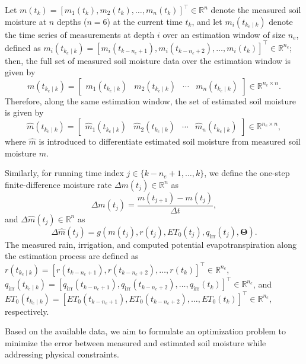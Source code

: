\documentclass[pdflatex,sn-nature]{sn-jnl}%
\theoremstyle{thmstyleone}%
\theoremstyle{thmstyletwo}%
\theoremstyle{thmstylethree}%
\begin{document}
Let \( m(t_k) = [m_1(t_k), m_2(t_k), \dots, m_n(t_k)]^\top \in \mathbb{R}^{n} \) denote the measured soil moisture at $n$ depths ($n=6$) at the current time \( t_k \), and let \( m_i(t_{k_e \mid k}) \) denote the time series of measurements at depth \( i \) over an estimation window of size $n_e$, defined as  
${m_i(t_{k_e \mid k})}=\left[m_i(t_{k-n_e +1}), m_i(t_{k-n_e +2}), \dots, m_i(t_{k}) \right]^\top \in \mathbb{R}^{n_e}$;
then, the full set of measured soil moisture data over the estimation window is given by 
\[
m(t_{k_e \mid k}) = \begin{bmatrix}
m_1(t_{k_e \mid k}) & m_2(t_{k_e \mid k}) & \cdots & m_n(t_{k_e \mid k})
\end{bmatrix} \in \mathbb{R}^{n_e \times n}. 
\] 
Therefore, along the same estimation window, the set of estimated soil moisture is given by  
\[
\hat{m}(t_{k_e \mid k}) = \begin{bmatrix}
\hat{m}_1(t_{k_e \mid k}) & \hat{m}_2(t_{k_e \mid k}) & \cdots & \hat{m}_n(t_{k_e \mid k})
\end{bmatrix} \in \mathbb{R}^{n_e \times n}, 
\] 
where $\hat{m}$ is introduced to differentiate estimated soil moisture from measured soil moisture $m$. 

Similarly, for running time index \( j \in \{k - n_e + 1, \dots, k\} \), we define the one-step finite-difference moisture rate \(\Delta m(t_j) \in \mathbb{R}^{n}\) as 
\[
\Delta m(t_j) = \frac{m(t_{j+1})-m(t_j)}{\Delta t},
\]
and \(\Delta \hat{m}(t_j) \in \mathbb{R}^{n}\) as 
\[
\Delta \hat{m}(t_j) = g(m(t_j),r(t_j),ET_0(t_j),q_{\mathrm{irr}}(t_j),\boldsymbol{\Theta}).
\]
The measured rain, irrigation, and computed potential evapotranspiration along the estimation process are defined as 
${r(t_{k_e \mid k})}=\left[r(t_{k-n_e +1}), r(t_{k-n_e +2}), \dots, r(t_{k}) \right]^\top \in \mathbb{R}^{n_e}$, 
${q_{\mathrm{irr}}(t_{k_e \mid k})}=\left[q_{\mathrm{irr}}(t_{k-n_e +1}), q_{\mathrm{irr}}(t_{k-n_e +2}), \dots, q_{\mathrm{irr}}(t_{k}) \right]^\top \in \mathbb{R}^{n_e}$,
and 
${ET_0(t_{k_e \mid k})}=\left[ET_0(t_{k-n_e +1}), ET_0(t_{k-n_e +2}), \dots, ET_0(t_{k}) \right]^\top \in \mathbb{R}^{n_e}$, 
respectively. 

Based on the available data, we aim to formulate an optimization problem to minimize the error between measured and estimated soil moisture while addressing physical constraints.
\end{document}
